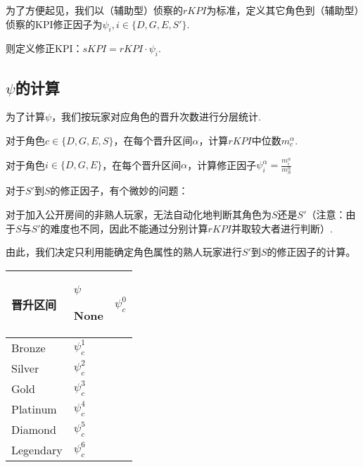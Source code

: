 \documentclass{ctexart}
\begin{document}
为了方便起见，我们以（辅助型）侦察的$rKPI$为标准，定义其它角色到（辅助型）侦察的KPI修正因子为$\psi_i, i \in \{D, G, E, S'\}$.

则定义修正KPI：$sKPI = rKPI \cdot \psi_i$.

\subsection{$\psi$的计算}

为了计算$\psi$，我们按玩家对应角色的晋升次数进行分层统计.

对于角色$c \in \{D, G, E, S\}$，在每个晋升区间$\alpha$，计算$rKPI$中位数$m_c^\alpha$.

对于角色$i \in \{D, G, E\}$，在每个晋升区间$\alpha$，计算修正因子$\psi_i^\alpha = \frac{m_i^\alpha}{m_S^\alpha}$

对于$S'$到$S$的修正因子，有个微妙的问题：

对于加入公开房间的非熟人玩家，无法自动化地判断其角色为$S$还是$S'$（注意：由于$S$与$S'$的难度也不同，因此不能通过分别计算$rKPI$并取较大者进行判断）.

由此，我们决定只利用能确定角色属性的熟人玩家进行$S'$到$S$的修正因子的计算。

\begin{longtable}{|>{\centering\arraybackslash}p{6em}|>{\centering\arraybackslash}p{4em}|}
    \hline

    晋升区间      & $\psi$ \endhead

    \hline

    None      & $\psi_c^0$      \\

    \hline

    Bronze    & $\psi_c^1$      \\

    \hline

    Silver    & $\psi_c^2$      \\

    \hline

    Gold      & $\psi_c^3$      \\

    \hline

    Platinum  & $\psi_c^4$      \\

    \hline

    Diamond   & $\psi_c^5$      \\

    \hline

    Legendary & $\psi_c^6$      \\

    \hline
\end{longtable}
\end{document}
